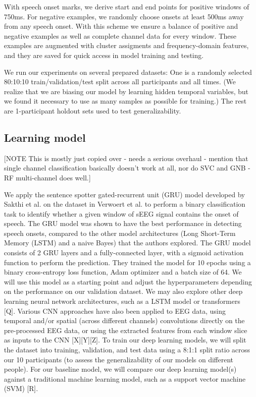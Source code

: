 \documentclass[format=sigconf, nonacm=true, review=true, screen=true]{acmart}
\begin{document}
With speech onset marks, we derive start and end points for positive windows of 750ms. For negative examples, we randomly choose onsets at least 500ms away from any speech onset. With this scheme we ensure a balance of positive and negative examples as well as complete channel data for every window. These examples are augmented with cluster assigments and frequency-domain features, and they are saved for quick access in model training and testing.

We run our experiments on several prepared datasets: One is a randomly selected 80:10:10 train/validation/test split across all participants and all times. (We realize that we are biasing our model by learning hidden temporal variables, but we found it necessary to use as many samples as possible for training.) The rest are 1-participant holdout sets used to test generalizability.

\subsection{Learning model}

[NOTE This is mostly just copied over - needs a serious overhaul - mention that single channel classification basically doesn't work at all, nor do SVC and GNB - RF multi-channel does well.]

We apply the sentence spotter gated-recurrent unit (GRU) model developed by Sakthi et al. \cite{sakthi2021keyword} on the dataset in Verwoert et al. \cite{verwoert2022dataset} to perform a binary classification task to identify whether a given window of sEEG signal contains the onset of speech. The GRU model was shown to have the best performance in detecting speech onsets, compared to the other model architectures (Long Short-Term Memory (LSTM) and a naive Bayes) that the authors explored. \cite{sakthi2021keyword} The GRU model consists of 2 GRU layers and a fully-connected layer, with a sigmoid activation function to perform the prediction. \cite{sakthi2021keyword} They trained the model for 10 epochs using a binary cross-entropy loss function, Adam optimizer and a batch size of 64. We will use this model as a starting point and adjust the hyperparameters depending on the performance on our validation dataset. We may also explore other deep learning neural network architectures, such as a LSTM model \cite{sakthi2021keyword} or transformers [Q]. Various CNN approaches have also been applied to EEG data, using temporal and/or spatial (across different channels) convolutions directly on the pre-processed EEG data, or using the extracted features from each window slice as inputs to the CNN [X][Y][Z]. To train our deep learning models, we will split the dataset into training, validation, and test data using a 8:1:1 split ratio across our 10 participants (to assess the generalizability of our models on different people). For our baseline model, we will compare our deep learning model(s) against a traditional machine learning model, such as a support vector machine (SVM) [R].
\end{document}
